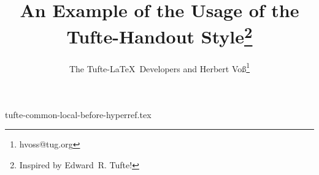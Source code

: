 

\begin{filecontents}{tufte-common-local-before-hyperref.tex}
\usepackage{amsmath}
\usepackage{graphicx} %
  \graphicspath{{graphics/}} %
\usepackage{booktabs} %
\usepackage{units}    %
\usepackage{multicol} %
\usepackage{lipsum}   %
\usepackage{fancyvrb} %
\usepackage{minted-code}
\end{filecontents}

\documentclass[debug=false,origFonts]{xtufte-handout}




\title{An Example of the Usage of the Tufte-Handout Style\thanks{Inspired by Edward~R. Tufte!}}
\author[The Tufte-LaTeX Developers]{The Tufte-\LaTeX\ Developers 
  and Herbert Voß\thanks{hvoss@tug.org}}




\newcommand{\doccmd}[1]{\texttt{\textbackslash#1}%
  \index{#1@/textbackslash#1}}%
\newcommand{\docopt}[1]{\ensuremath{\langle}\textrm{\textit{#1}}\ensuremath{\rangle}}%
\newcommand{\docarg}[1]{\textrm{\textit{#1}}}%
\newcommand{\docenv}[1]{\textsf{#1}\index{#1@textsf{#1} (environment)}}%
\newcommand{\docpkg}[1]{\texttt{#1}}%
\newcommand{\doccls}[1]{\texttt{#1}}%
\newcommand{\docclsopt}[1]{\texttt{#1}}%
\newenvironment{docspec}{\begin{quote}\noindent}{\end{quote}}%
\newcommand\xPack[1]{\texttt{#1}\index{#1 (package)}}



\maketitle%

